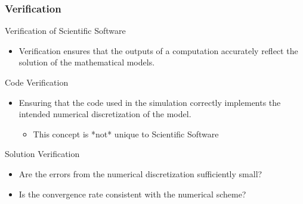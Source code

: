 \documentclass[mathserif]{beamer}
\begin{document}
\begin{frame}
  \frametitle{Verification}

  \begin{block}{Verification of Scientific Software}
    \begin{itemize}
    \item Verification ensures that the outputs of a computation accurately reflect the solution of the mathematical models.
    \end{itemize}
  \end{block}

  \begin{block}{Code Verification}
    \begin{itemize}
    \item Ensuring that the code used in the simulation correctly
	  implements the intended numerical discretization of the model.
	  \begin{itemize}
	   \item This concept is *not* unique to Scientific Software 
	  \end{itemize}
    \end{itemize}
  \end{block}

  \begin{block}{Solution Verification}
    \begin{itemize}
    \item Are the errors from the numerical discretization sufficiently small?
    \item Is the convergence rate consistent with the numerical scheme?
    \end{itemize}
  \end{block}
  
\end{frame}

\end{document}
